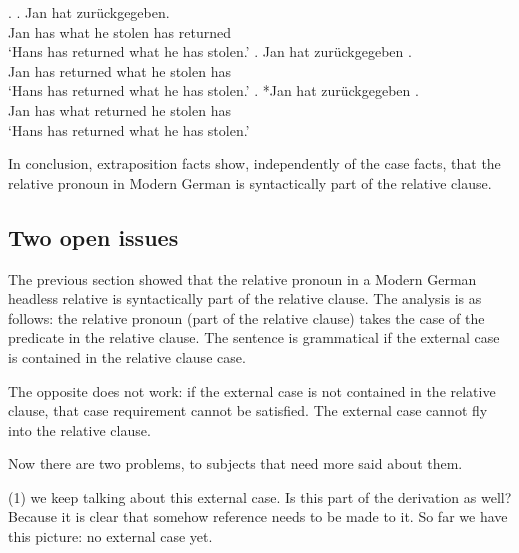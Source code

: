 \ex.\label{ex:extra-headless}
\ag. Jan hat     zurückgegeben.\\
Jan has what he stolen has returned\\
`Hans has returned what he has stolen.' \citet[185]{groos1981}\label{ex:extra-headless-base}
\bg. Jan hat zurückgegeben    .\\
Jan has returned what he stolen has\\
`Hans has returned what he has stolen.' \citet[185]{groos1981}\label{ex:extra-headless-clause}
\bg. *Jan hat  zurückgegeben   .\\
Jan has what returned he stolen has\\
`Hans has returned what he has stolen.' \citet[185]{groos1981}\label{ex:extra-headless-no-rel}

In conclusion, extraposition facts show, independently of the case facts, that the relative pronoun in Modern German is syntactically part of the relative clause.


\subsection{Two open issues}

The previous section showed that the relative pronoun in a Modern German headless relative is syntactically part of the relative clause. The analysis is as follows: the relative pronoun (part of the relative clause) takes the case of the predicate in the relative clause. The sentence is grammatical if the external case is contained in the relative clause case.

The opposite does not work: if the external case is not contained in the relative clause, that case requirement cannot be satisfied. The external case cannot fly into the relative clause.

Now there are two problems, to subjects that need more said about them.

(1) we keep talking about this external case. Is this part of the derivation as well? Because it is clear that somehow reference needs to be made to it. So far we have this picture: no external case yet. %

